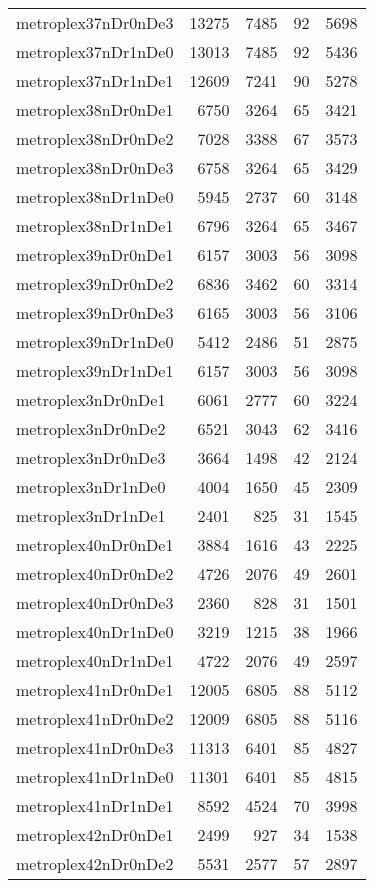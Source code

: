 \begin{longtable}{lrrrr}
metroplex37nDr0nDe3 & 13275 & 7485 & 92 & 5698 \\
metroplex37nDr1nDe0 & 13013 & 7485 & 92 & 5436 \\
metroplex37nDr1nDe1 & 12609 & 7241 & 90 & 5278 \\
metroplex38nDr0nDe1 & 6750 & 3264 & 65 & 3421 \\
metroplex38nDr0nDe2 & 7028 & 3388 & 67 & 3573 \\
metroplex38nDr0nDe3 & 6758 & 3264 & 65 & 3429 \\
metroplex38nDr1nDe0 & 5945 & 2737 & 60 & 3148 \\
metroplex38nDr1nDe1 & 6796 & 3264 & 65 & 3467 \\
metroplex39nDr0nDe1 & 6157 & 3003 & 56 & 3098 \\
metroplex39nDr0nDe2 & 6836 & 3462 & 60 & 3314 \\
metroplex39nDr0nDe3 & 6165 & 3003 & 56 & 3106 \\
metroplex39nDr1nDe0 & 5412 & 2486 & 51 & 2875 \\
metroplex39nDr1nDe1 & 6157 & 3003 & 56 & 3098 \\
metroplex3nDr0nDe1 & 6061 & 2777 & 60 & 3224 \\
metroplex3nDr0nDe2 & 6521 & 3043 & 62 & 3416 \\
metroplex3nDr0nDe3 & 3664 & 1498 & 42 & 2124 \\
metroplex3nDr1nDe0 & 4004 & 1650 & 45 & 2309 \\
metroplex3nDr1nDe1 & 2401 & 825 & 31 & 1545 \\
metroplex40nDr0nDe1 & 3884 & 1616 & 43 & 2225 \\
metroplex40nDr0nDe2 & 4726 & 2076 & 49 & 2601 \\
metroplex40nDr0nDe3 & 2360 & 828 & 31 & 1501 \\
metroplex40nDr1nDe0 & 3219 & 1215 & 38 & 1966 \\
metroplex40nDr1nDe1 & 4722 & 2076 & 49 & 2597 \\
metroplex41nDr0nDe1 & 12005 & 6805 & 88 & 5112 \\
metroplex41nDr0nDe2 & 12009 & 6805 & 88 & 5116 \\
metroplex41nDr0nDe3 & 11313 & 6401 & 85 & 4827 \\
metroplex41nDr1nDe0 & 11301 & 6401 & 85 & 4815 \\
metroplex41nDr1nDe1 & 8592 & 4524 & 70 & 3998 \\
metroplex42nDr0nDe1 & 2499 & 927 & 34 & 1538 \\
metroplex42nDr0nDe2 & 5531 & 2577 & 57 & 2897 \\

\end{longtable}
